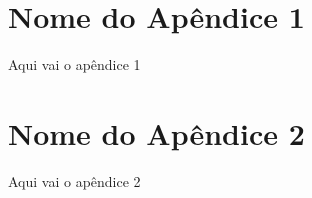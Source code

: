 \begin{apendicesenv}
\chapter{Nome do Apêndice 1}

Aqui vai o apêndice 1

\chapter{Nome do Apêndice 2}

Aqui vai o apêndice 2
\end{apendicesenv}